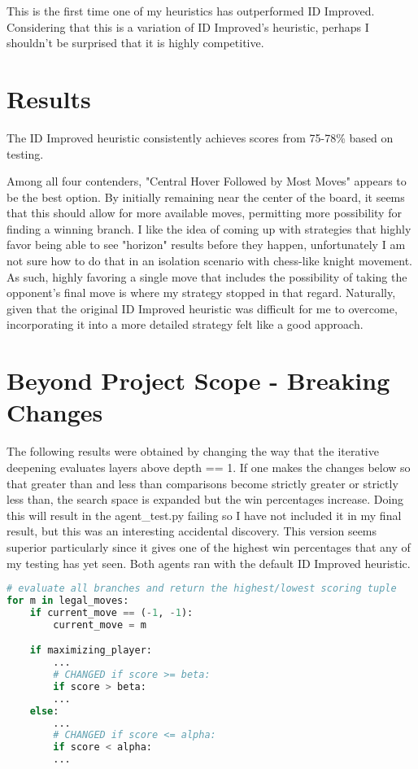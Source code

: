\documentclass[10pt, a4paper]{article}
\begin{document}
This is the first time one of my heuristics has outperformed ID Improved.  Considering that this
is a variation of ID Improved's heuristic, perhaps I shouldn't be surprised that it is highly competitive.

\section{Results}

The ID Improved heuristic consistently achieves scores from 75-78\% based on testing.

Among all four contenders, "Central Hover Followed by Most Moves" appears to be the best option.
By initially remaining near the center of the board, it seems
that this should allow for more available moves, permitting more possibility for finding a winning branch.
I like the idea of coming up with strategies that highly favor being able to see "horizon" results 
before they happen, unfortunately I am not sure how to do that in an isolation scenario with chess-like knight movement.
As such, highly favoring a single move that includes the possibility of taking the opponent's final move
is where my strategy stopped in that regard.  Naturally, given that the original ID Improved heuristic
was difficult for me to overcome, incorporating it into a more detailed strategy felt like a good approach.

\section{Beyond Project Scope - Breaking Changes}

The following results were obtained by changing the way that the iterative deepening
evaluates layers above depth == 1.  If one makes the changes below so that greater than and
less than comparisons become strictly greater or strictly less than, the search space is
expanded but the win percentages increase.  Doing this will result in the agent\_test.py
failing so I have not included it in my final result, but this was an interesting accidental
discovery.  This version seems superior particularly since it gives one of the highest win percentages
that any of my testing has yet seen.  Both agents ran with the default ID Improved heuristic.

\begin{lstlisting}[language=Python]
# evaluate all branches and return the highest/lowest scoring tuple
for m in legal_moves:
	if current_move == (-1, -1):
		current_move = m

	if maximizing_player:
		...
		# CHANGED if score >= beta:
		if score > beta:
		...
	else:	
		...
		# CHANGED if score <= alpha:
		if score < alpha:
		...
\end{lstlisting}
\end{document}

